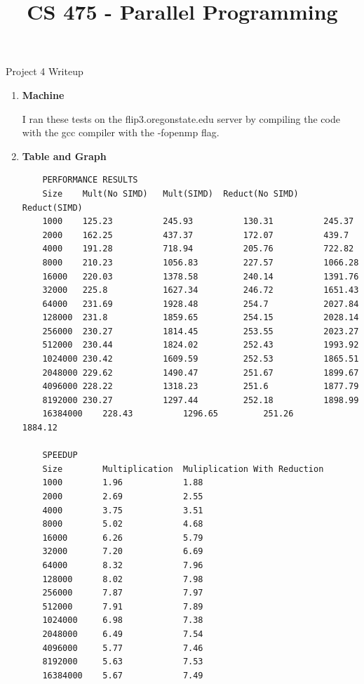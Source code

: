 \documentclass[11pt,letterpaper]{article}
\begin{document}
 \univlogo

\title{CS 475 - Parallel Programming}
{\Huge Project 4 Writeup}\\[5mm]

\begin{enumerate}
  \item \textbf{Machine} 

      I ran these tests on the flip3.oregonstate.edu server by compiling the code with the
        gcc compiler with the -fopenmp flag. 

  \item \textbf{Table and Graph} 
    \begin{lstlisting}
    PERFORMANCE RESULTS
    Size	Mult(No SIMD)	Mult(SIMD)	Reduct(No SIMD)	Reduct(SIMD)
    1000	125.23	        245.93	        130.31	        245.37	    
    2000	162.25	        437.37	        172.07	        439.7	    
    4000	191.28	        718.94	        205.76	        722.82	    
    8000	210.23	        1056.83	        227.57	        1066.28	    
    16000	220.03	        1378.58	        240.14	        1391.76	    
    32000	225.8	        1627.34	        246.72	        1651.43	    
    64000	231.69	        1928.48	        254.7	        2027.84	    
    128000	231.8	        1859.65	        254.15	        2028.14	    
    256000	230.27	        1814.45	        253.55	        2023.27	    
    512000	230.44	        1824.02	        252.43	        1993.92	    
    1024000	230.42	        1609.59	        252.53	        1865.51	    
    2048000	229.62	        1490.47	        251.67	        1899.67	    
    4096000	228.22	        1318.23	        251.6	        1877.79	    
    8192000	230.27	        1297.44	        252.18	        1898.99	    
    16384000	228.43	        1296.65	        251.26	        1884.12	    

    SPEEDUP
    Size        Multiplication	Muliplication With Reduction
    1000        1.96	        1.88
    2000        2.69	        2.55
    4000        3.75	        3.51
    8000        5.02	        4.68
    16000       6.26	        5.79
    32000       7.20	        6.69
    64000       8.32	        7.96
    128000      8.02	        7.98
    256000      7.87	        7.97
    512000      7.91	        7.89
    1024000     6.98	        7.38
    2048000     6.49	        7.54
    4096000     5.77	        7.46
    8192000     5.63	        7.53
    16384000    5.67	        7.49
    \end{lstlisting}


\end{enumerate}
\end{document}
